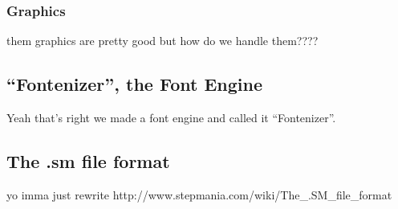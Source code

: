 	\subsubsection{Graphics}
		them graphics are pretty good but how do we handle them????
\subsection{``Fontenizer'', the Font Engine}
	Yeah that's right we made a font engine and called it ``Fontenizer''.
\subsection{The .sm file format}
	yo imma just rewrite http://www.stepmania.com/wiki/The_.SM_file_format